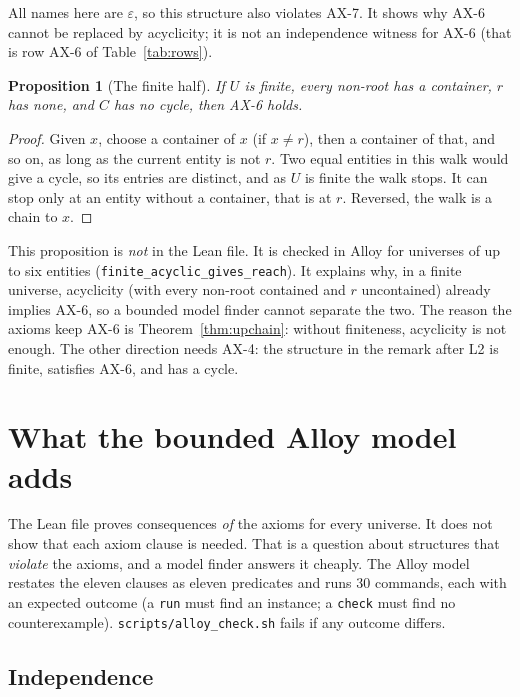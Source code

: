 \documentclass[11pt,a4paper]{article}
\newcommand{\eps}{\varepsilon}
\newcommand{\U}{U}
\newcommand{\lean}[1]{\texttt{\small #1}}
\theoremstyle{plain}
\newtheorem{proposition}[theorem]{Proposition}
\theoremstyle{definition}
\theoremstyle{remark}
\begin{document}
All names here are $\eps$, so this structure also violates AX-7. It shows
why AX-6 cannot be replaced by acyclicity; it is not an independence witness
for AX-6 (that is row AX-6 of Table~\ref{tab:rows}).

\begin{proposition}[The finite half]\label{prop:finitehalf}
If $\U$ is finite, every non-root has a container, $r$ has none, and $C$ has
no cycle, then AX-6 holds.
\end{proposition}

\begin{proof}
Given $x$, choose a container of $x$ (if $x\neq r$), then a container of
that, and so on, as long as the current entity is not $r$. Two equal entities
in this walk would give a cycle, so its entries are distinct, and as $\U$ is
finite the walk stops. It can stop only at an entity without a container,
that is at $r$. Reversed, the walk is a chain to $x$.
\end{proof}

This proposition is \emph{not} in the Lean file. It is checked in Alloy for
universes of up to six entities (\lean{finite\_acyclic\_gives\_reach}). It
explains why, in a finite universe, acyclicity (with every non-root
contained and $r$ uncontained) already implies AX-6, so a bounded model finder
cannot separate the two. The reason the axioms keep AX-6 is
Theorem~\ref{thm:upchain}: without finiteness, acyclicity is not enough. The
other direction needs AX-4: the structure in the remark after L2 is finite,
satisfies AX-6, and has a cycle.

\section{What the bounded Alloy model adds}
\label{sec:alloy}

The Lean file proves consequences \emph{of} the axioms for every universe.
It does not show that each axiom clause is needed. That is a question about
structures that \emph{violate} the axioms, and a model finder answers it
cheaply. The Alloy model restates the eleven clauses as eleven predicates
and runs 30 commands, each with an expected outcome (a \texttt{run} must find
an instance; a \texttt{check} must find no counterexample).
\lean{scripts/alloy\_check.sh} fails if any outcome differs.

\subsection{Independence}
\end{document}
